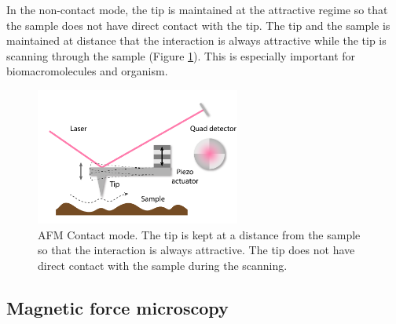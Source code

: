 \documentclass[pdflatex, sectionletters, 12pt]{pittetd}    %
\begin{document}
In the non-contact mode, the tip is maintained at the attractive regime so that the sample does not have direct contact with the tip. The tip and the sample is maintained at distance that the interaction is always attractive while the tip is scanning through the sample (Figure \ref{FIG:NonContactAFM}). This is especially important for biomacromolecules and organism. 

\begin{figure}[h!]
	\centering
	\includegraphics[width=0.6\textwidth]{Drawing/NonContactAFM.pdf}
	\caption{AFM Contact mode. The tip is kept at a distance from the sample so that the interaction is always attractive. The tip does not have direct contact with the sample during the scanning.}
	\label{FIG:NonContactAFM}
\end{figure}

\subsection{Magnetic force microscopy}
\end{document}
